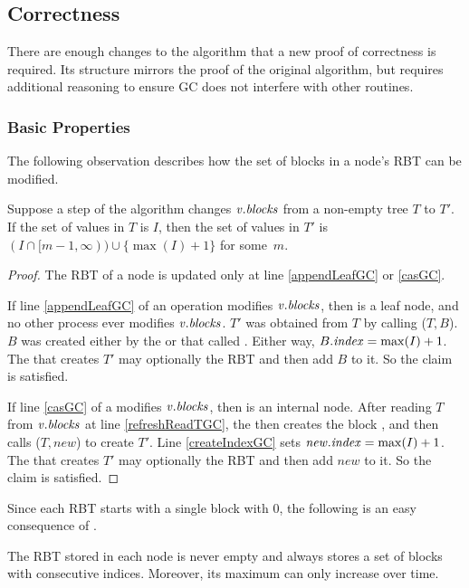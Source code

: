
\subsection{Correctness}
There are enough changes to the algorithm that a new proof of correctness
is required.  Its structure mirrors the proof of the original algorithm, but requires additional
reasoning to ensure GC does not interfere with other routines.

\subsubsection{Basic Properties}

The following observation describes
how the set of blocks in a node's RBT can be modified.

\begin{lemma}\label{RBTupdates}
Suppose a step of the algorithm changes $\mbox{\textnormal{\textit{v}}}.\mbox{\textit{blocks}}$ from a non-empty tree $T$ to $T'$.
If the set of  values  in $T$ is $I$, then the set of  values in $T'$ is 
$(I \cap [m-1,\infty))\cup \{\max(I) + 1\}$ for some~$m$.
\end{lemma}
\begin{proof}
The RBT of a node is updated only at line \ref{appendLeafGC} or \ref{casGC}.

If line \ref{appendLeafGC} of an  operation modifies $\mbox{\textnormal{\textit{v}}}.\mbox{\textit{blocks}}$,
then  is a leaf node, and no other process ever modifies $\mbox{\textnormal{\textit{v}}}.\mbox{\textit{blocks}}$.
$T'$ was obtained from $T$ by calling ($T,B$).
$B$ was created either by the  or  that called .
Either way, $B.\mbox{\textit{index}} = \max(I)+1$.
The  that creates $T'$ may optionally  the RBT and then add $B$ to it.
So the claim is satisfied.

If line \ref{casGC} of a  modifies $\mbox{\textnormal{\textit{v}}}.\mbox{\textit{blocks}}$, then  is an internal node.
After reading $T$ from $\mbox{\textnormal{\textit{v}}}.\mbox{\textit{blocks}}$ at line \ref{refreshReadTGC},
the  then creates the  block ,
and then calls ($T,new$) to create $T'$.
Line \ref{createIndexGC} sets $\mbox{\textnormal{\textit{new}}}.\mbox{\textnormal{\textit{index}}} = \max(I)+1$.
The  that creates $T'$ may optionally  the RBT and then add $new$ to it.
So the claim is satisfied.
\end{proof}

Since each RBT starts with a single block with  0, the following is an easy consequence of .
\begin{corollary}\label{nonEmptyIncreasing}
The RBT stored in each node  is never empty and always stores a set of blocks with consecutive indices.
Moreover, its maximum  can only increase over time.
\end{corollary}

